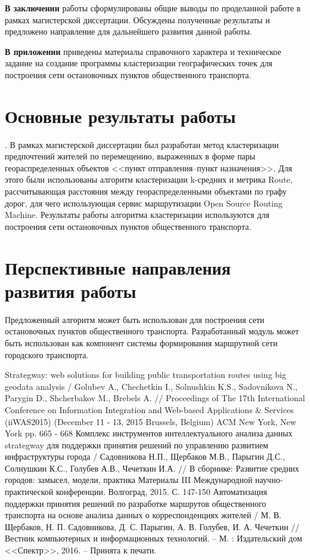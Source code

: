 \textbf{В заключении} работы сформулированы общие выводы по проделанной работе в рамках магистерской диссертации. Обсуждены полученные результаты и предложено направление для дальнейшего развития данной работы.

\textbf{В приложении} приведены материалы справочного характера и техническое задание на создание программы кластеризации географических точек для построения сети остановочных пунктов общественного транспорта.

\section{Основные результаты работы}. В рамках магистерской диссертации был разработан метод кластеризации предпочтений жителей по перемещению, выраженных в форме пары геораспределенных объектов <<пункт отправления--пункт назначения>>. Для этого были использованы алгоритм кластеризации k-средних и метрика Route, рассчитывающая расстояния между геораспределенными объектами по графу дорог, для чего использующая сервис маршрутизации Open Source Routing Machine. Результаты работы алгоритма кластеризации используются для построения сети остановочных пунктов общественного транспорта.

\section{Перспективные направления развития работы}
Предложенный алгоритм может быть использован для построения сети остановочных пунктов общественного транспорта.
Разработанный модуль может быть использован как компонент системы формирования маршрутной сети городского транспорта.

\renewcommand{\bibname}{Публикации по теме диссертации}
\begin{thebibliography}{10}
     Strategway: web solutions for building public transportation routes using big geodata 
        analysis / Golubev A., Chechetkin I., Solnushkin K.S., Sadovnikova N., Parygin D., Shcherbakov M., 
        Brebels A. // Proceedings of The 17th International Conference on Information Integration and 
        Web-based Applications \& Services (iiWAS2015) (December 11 - 13, 2015 Brussels, Belgium) 
        ACM New York, New York pp. 665 - 668
     Комплекс инструментов интеллектуального анализа данных strategway для поддержки 
        принятия решений по управлению развитием инфраструктуры города / Садовникова Н.П., Щербаков М.В., 
        Парыгин Д.С., Солнушкин К.С., Голубев А.В., Чечеткин И.А. // В сборнике: Развитие средних 
        городов: замысел, модели, практика Материалы III Международной научно-практической конференции. 
        Волгоград, 2015. С. 147-150
     Автоматизация поддержки принятия решений по разработке маршрутов общественного 
        транспорта на основе анализа данных о корреспонденциях жителей / М. В. Щербаков, 
        Н. П. Садовникова, Д. С. Парыгин, А. В. Голубев, И. А. Чечеткин // Вестник компьютерных и 
        информационных технологий. -- М. : Издательский дом <<Спектр>>, 2016. -- Принята к печати.
\end{thebibliography}